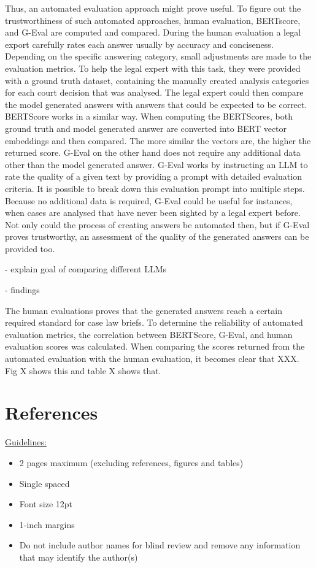 \documentclass[a4paper,12pt]{article}
\begin{document}
Thus, an automated evaluation approach might prove useful. To figure out the trustworthiness of such automated approaches, human evaluation, BERTscore, and G-Eval are computed and compared. During the human evaluation a legal export carefully rates each answer usually by accuracy and conciseness. Depending on the specific answering category, small adjustments are made to the evaluation metrics. To help the legal expert with this task, they were provided with a ground truth dataset, containing the manually created analysis categories for each court decision that was analysed. The legal expert could then compare the model generated answers with answers that could be expected to be correct. BERTScore works in a similar way. When computing the BERTScores, both ground truth and model generated answer are converted into BERT vector embeddings and then compared. The more similar the vectors are, the higher the returned score. G-Eval on the other hand does not require any additional data other than the model generated answer. G-Eval works by instructing an LLM to rate the quality of a given text by providing a prompt with detailed evaluation criteria. It is possible to break down this evaluation prompt into multiple steps. Because no additional data is required, G-Eval could be useful for instances, when cases are analysed that have never been sighted by a legal expert before. Not only could the process of creating answers be automated then, but if G-Eval proves trustworthy, an assessment of the quality of the generated answers can be provided too.

- explain goal of comparing different LLMs

- findings

The human evaluations proves that the generated answers reach a certain required standard for case law briefs. To determine the reliability of automated evaluation metrics, the correlation between BERTScore, G-Eval, and human evaluation scores was calculated. When comparing the scores returned from the automated evaluation with the human evaluation, it becomes clear that XXX. Fig X shows this and table X shows that.

\section*{References}

\vskip 40pt
\underline {Guidelines:}
\begin{itemize}
\itemsep0pt
  \item 2 pages maximum (excluding references, figures and tables)
  \item Single spaced
  \item Font size 12pt
  \item 1-inch margins
  \item Do not include author names for blind review and remove any information that may identify the author(s)
\end{itemize}
\end{document}
